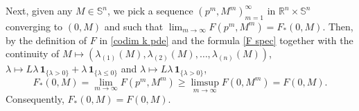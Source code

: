 \documentclass[11pt]{amsart}
\numberwithin{equation}{section}
\begin{document}
\medskip

%

Next, given any $M\in\mathbb{S}^n$, we pick a sequence $(p^m,M^m)_{m=1}^\infty$ in ${\mathbb R}^n\times\mathbb{S}^n$ converging to $(0,M)$ and such that $\lim_{m\to\infty} F(p^m,M^m)=F_*(0,M)$. Then, by the definition of $F$ in \eqref{codim k pde} and the formula \eqref{F spec} together with the continuity of $M\mapsto(\lambda_{(1)}(M),\lambda_{(2)}(M),\ldots,\lambda_{(n)}(M))$, $\lambda\mapsto L\lambda\,\mathbf{1}_{\{\lambda>0\}}+\lambda\,\mathbf{1}_{\{\lambda\le0\}}$ and $\lambda\mapsto L\lambda\,\mathbf{1}_{\{\lambda>0\}}$,
\begin{equation}
F_*(0,M)=\lim_{m\to\infty} F(p^m,M^m)\geq \limsup_{m\to\infty} F(0,M^m) =F(0, M).
\end{equation}
Consequently, $F_*(0,M)=F(0,M)$. 

\medskip
\end{document}
